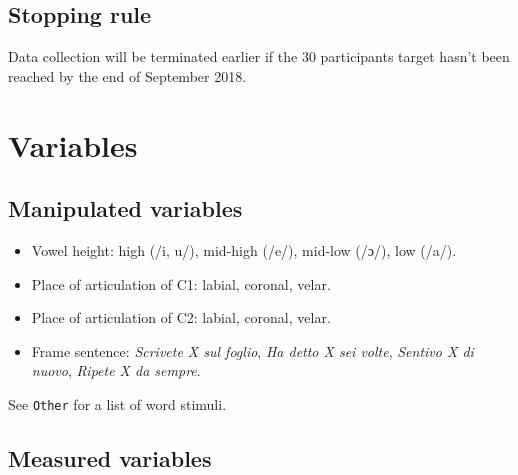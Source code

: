 \documentclass[11pt,]{article}
\providecommand{\tightlist}{%
  \setlength{\itemsep}{0pt}\setlength{\parskip}{0pt}}
\begin{document}
\hypertarget{stopping-rule}{%
\subsection{Stopping rule}\label{stopping-rule}}

Data collection will be terminated earlier if the 30 participants target
hasn't been reached by the end of September 2018.

\hypertarget{variables}{%
\section{Variables}\label{variables}}

\hypertarget{manipulated-variables}{%
\subsection{Manipulated variables}\label{manipulated-variables}}

\begin{itemize}
\tightlist
\item
  Vowel height: high (/i, u/), mid-high (/e/), mid-low (/ɔ/), low (/a/).
\item
  Place of articulation of C1: labial, coronal, velar.
\item
  Place of articulation of C2: labial, coronal, velar.
\item
  Frame sentence: \emph{Scrivete X sul foglio}, \emph{Ha detto X sei
  volte}, \emph{Sentivo X di nuovo}, \emph{Ripete X da sempre}.
\end{itemize}

See \texttt{Other} for a list of word stimuli.

\hypertarget{measured-variables}{%
\subsection{Measured variables}\label{measured-variables}}
\end{document}
